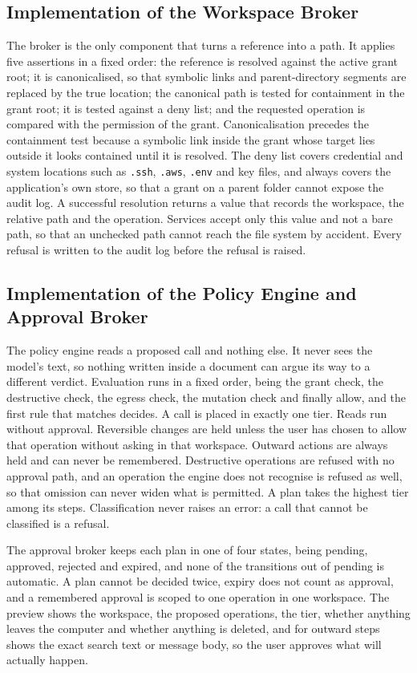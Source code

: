 \documentclass{FastFyp}
\begin{document}
\subsection{Implementation of the Workspace Broker}
The broker is the only component that turns a reference into a path. It applies five assertions in a fixed order: the reference is resolved against the active grant root; it is canonicalised, so that symbolic links and parent-directory segments are replaced by the true location; the canonical path is tested for containment in the grant root; it is tested against a deny list; and the requested operation is compared with the permission of the grant. Canonicalisation precedes the containment test because a symbolic link inside the grant whose target lies outside it looks contained until it is resolved. The deny list covers credential and system locations such as \texttt{.ssh}, \texttt{.aws}, \texttt{.env} and key files, and always covers the application's own store, so that a grant on a parent folder cannot expose the audit log. A successful resolution returns a value that records the workspace, the relative path and the operation. Services accept only this value and not a bare path, so that an unchecked path cannot reach the file system by accident. Every refusal is written to the audit log before the refusal is raised.

\subsection{Implementation of the Policy Engine and Approval Broker}
The policy engine reads a proposed call and nothing else. It never sees the model's text, so nothing written inside a document can argue its way to a different verdict. Evaluation runs in a fixed order, being the grant check, the destructive check, the egress check, the mutation check and finally allow, and the first rule that matches decides. A call is placed in exactly one tier. Reads run without approval. Reversible changes are held unless the user has chosen to allow that operation without asking in that workspace. Outward actions are always held and can never be remembered. Destructive operations are refused with no approval path, and an operation the engine does not recognise is refused as well, so that omission can never widen what is permitted. A plan takes the highest tier among its steps. Classification never raises an error: a call that cannot be classified is a refusal.

The approval broker keeps each plan in one of four states, being pending, approved, rejected and expired, and none of the transitions out of pending is automatic. A plan cannot be decided twice, expiry does not count as approval, and a remembered approval is scoped to one operation in one workspace. The preview shows the workspace, the proposed operations, the tier, whether anything leaves the computer and whether anything is deleted, and for outward steps shows the exact search text or message body, so the user approves what will actually happen.
\end{document}
